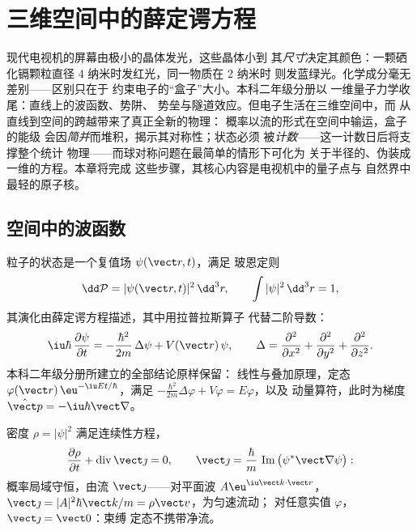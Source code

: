 \chapter{三维空间中的薛定谔方程}\label{ch:b3:schrodinger-three-dimensions}

现代电视机的屏幕由极小的晶体发光，这些晶体小到
其\emph{尺寸}决定其颜色：一颗硒化镉颗粒直径
4 纳米时发红光，同一物质在 2 纳米时
则发蓝绿光。化学成分毫无差别——区别只在于
约束电子的“盒子”大小。本科二年级分册以
一维量子力学收尾：直线上的波函数、势阱、
势垒与隧道效应。但电子生活在三维空间中，而
从直线到空间的跨越带来了真正全新的物理：
概率以流的形式在空间中输运，盒子的能级
会因\emph{简并}而堆积，揭示其对称性；状态必须
被\emph{计数}——这一计数日后将支撑整个统计
物理——而球对称问题在最简单的情形下可化为
关于半径的、伪装成一维的方程。本章将完成
这些步骤，其核心内容是电视机中的量子点与
自然界中最轻的原子核。

\section{空间中的波函数}

\begin{definition}[三维空间中的波函数与概率]\label{def:b3:schrodinger-three-dimensions:psi3d}
粒子的状态是一个复值场 $\psi(\vect r, t)$，满足
玻恩定则
\[
\dd\mathcal P = |\psi(\vect r, t)|^2\,\dd^3r , \qquad
\int|\psi|^2\,\dd^3r = 1 ,
\]
其演化由薛定谔方程描述，其中用拉普拉斯算子
代替二阶导数：
\[
\iu\hbar\,\frac{\partial\psi}{\partial t}
 = -\frac{\hbar^2}{2m}\,\Delta\psi + V(\vect r)\,\psi ,
\qquad
\Delta = \frac{\partial^2}{\partial x^2} +
\frac{\partial^2}{\partial y^2} + \frac{\partial^2}{\partial z^2} .
\]
本科二年级分册所建立的全部结论原样保留：
线性与叠加原理，定态
$\varphi(\vect r)\,\eu^{-\iu Et/\hbar}$，满足
$-\tfrac{\hbar^2}{2m}\Delta\varphi + V\varphi = E\varphi$，以及
动量算符，此时为梯度 $\hat{\vect p} =
-\iu\hbar\vect\nabla$。
\end{definition}

\begin{proposition}\label{prop:b3:schrodinger-three-dimensions:current}
密度 $\rho = |\psi|^2$ 满足连续性方程，
\[
\frac{\partial\rho}{\partial t} + \operatorname{div}\vect\jmath = 0 ,
\qquad
\vect\jmath = \frac{\hbar}{m}\,
\operatorname{Im}\big(\psi^*\vect\nabla\psi\big) :
\]
概率局域守恒，由流
$\vect\jmath$——对平面波 $A\eu^{\iu\vect k\cdot\vect r}$，
$\vect\jmath = |A|^2\hbar\vect k/m = \rho\vect v$，为匀速流动；
对任意实值 $\varphi$，$\vect\jmath = \vect 0$：束缚
定态不携带净流。
\end{proposition}

